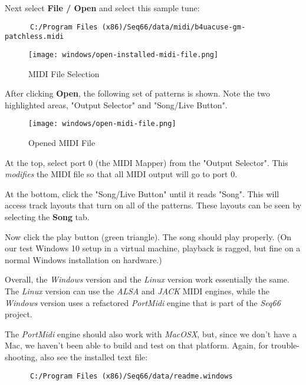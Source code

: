    Next select \textbf{File / Open} and select this sample tune:

   \begin{verbatim}
      C:/Program Files (x86)/Seq66/data/midi/b4uacuse-gm-patchless.midi
   \end{verbatim}

\begin{figure}[H]
   \centering 
   \texttt{[image: windows/open-installed-midi-file.png]}
   \caption{MIDI File Selection}
   \label{fig:windows_open_installed_midi_file}
\end{figure}

   After clicking \textbf{Open}, the following set of patterns is shown.
   Note the two highlighted areas, "Output Selector" and "Song/Live Button".

\begin{figure}[H]
   \centering 
   \texttt{[image: windows/open-midi-file.png]}
   \caption{Opened MIDI File}
   \label{fig:windows_open_midi_file}
\end{figure}

   At the top, select port 0 (the MIDI Mapper) from the "Output Selector".
   This \textsl{modifies} the MIDI file so that all MIDI
   output will go to port 0.

   At the bottom, click the "Song/Live Button" until it reads "Song".
   This will access track layouts that turn on all of the patterns.
   These layouts can be seen by selecting the \textbf{Song} tab.

   Now click the play button (green triangle).
   The song should play properly.
   (On our test Windows 10 setup in a virtual machine, playback is ragged,
   but fine on a normal Windows installation on hardware.)

   Overall, the \textsl{Windows} version and the \textsl{Linux} version
   work essentially the same. The \textsl{Linux} version can use the
   \textsl{ALSA} and \textsl{JACK} MIDI engines, while the \textsl{Windows}
   version uses a refactored \textsl{PortMidi} engine that is part of the
   \textsl{Seq66} project.

   The \textsl{PortMidi} engine should also work with \textsl{MacOSX}, but,
   since we don't have a Mac, we haven't been able to build and test
   on that platform.
   Again, for trouble-shooting, also see the installed text file:

   \begin{verbatim}
      C:/Program Files (x86)/Seq66/data/readme.windows
   \end{verbatim}

